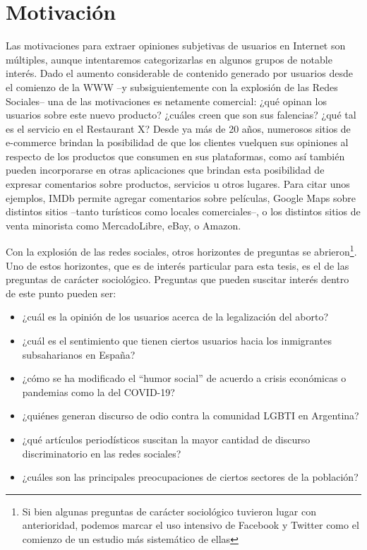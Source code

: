 \section{Motivación}

Las motivaciones para extraer opiniones subjetivas de usuarios en Internet son múltiples, aunque intentaremos categorizarlas en algunos grupos de notable interés. Dado el aumento considerable de contenido generado por usuarios desde el comienzo de la WWW --y subsiguientemente con la explosión de las Redes Sociales-- una de las motivaciones es netamente comercial: ¿qué opinan los usuarios sobre este nuevo producto? ¿cuáles creen que son sus falencias? ¿qué tal es el servicio en el Restaurant X? Desde ya más de 20 años, numerosos sitios de e-commerce brindan la posibilidad de que los clientes vuelquen sus opiniones al respecto de los productos que consumen en sus plataformas, como así también pueden incorporarse en otras aplicaciones que brindan esta posibilidad de expresar comentarios sobre productos, servicios u otros lugares. Para citar unos ejemplos, IMDb permite agregar comentarios sobre películas, Google Maps sobre distintos sitios --tanto turísticos como locales comerciales--, o los distintos sitios de venta minorista como MercadoLibre, eBay, o Amazon.

Con la explosión de las redes sociales, otros horizontes de preguntas se abrieron\footnote{Si bien algunas preguntas de carácter sociológico tuvieron lugar con anterioridad, podemos marcar el uso intensivo de Facebook y Twitter como el comienzo de un estudio más sistemático de ellas}. Uno de estos horizontes, que es de interés particular para esta tesis, es el de las preguntas de carácter sociológico. Preguntas que pueden suscitar interés dentro de este punto pueden ser:

\begin{itemize}
    \item ¿cuál es la opinión de los usuarios acerca de la legalización del aborto?
    \item ¿cuál es el sentimiento que tienen ciertos usuarios hacia los inmigrantes subsaharianos en España?
    \item ¿cómo se ha modificado el ``humor social'' de acuerdo a crisis económicas o pandemias como la del COVID-19?
    \item ¿quiénes generan discurso de odio contra la comunidad LGBTI en Argentina?
    \item ¿qué artículos periodísticos suscitan la mayor cantidad de discurso discriminatorio en las redes sociales?
    \item ¿cuáles son las principales preocupaciones de ciertos sectores de la población?
\end{itemize}

